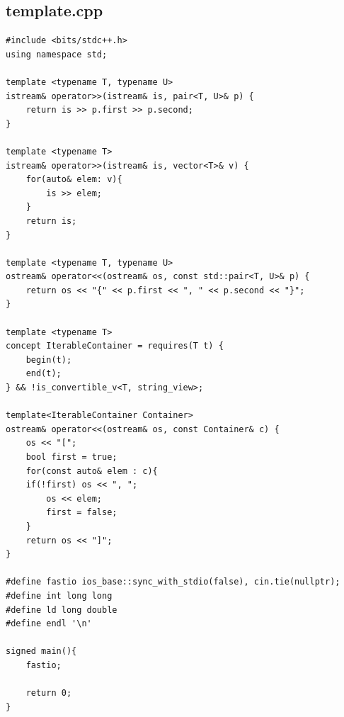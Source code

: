 \documentclass[11pt, a4paper, twoside]{article}
\begin{document}
\subsection{template.cpp}
\begin{lstlisting}
#include <bits/stdc++.h>
using namespace std;

template <typename T, typename U>
istream& operator>>(istream& is, pair<T, U>& p) {
	return is >> p.first >> p.second;
}

template <typename T>
istream& operator>>(istream& is, vector<T>& v) {
	for(auto& elem: v){
		is >> elem;
	}
	return is;
}

template <typename T, typename U>
ostream& operator<<(ostream& os, const std::pair<T, U>& p) {
	return os << "{" << p.first << ", " << p.second << "}";
}

template <typename T>
concept IterableContainer = requires(T t) {
    begin(t);
    end(t);
} && !is_convertible_v<T, string_view>;

template<IterableContainer Container>
ostream& operator<<(ostream& os, const Container& c) {
	os << "[";
	bool first = true;
	for(const auto& elem : c){
	if(!first) os << ", ";
 		os << elem;
		first = false;
	}
	return os << "]";
}

#define fastio ios_base::sync_with_stdio(false), cin.tie(nullptr);
#define int long long
#define ld long double
#define endl '\n'

signed main(){
	fastio;
	
	return 0;
}
\end{lstlisting}
\end{document}

